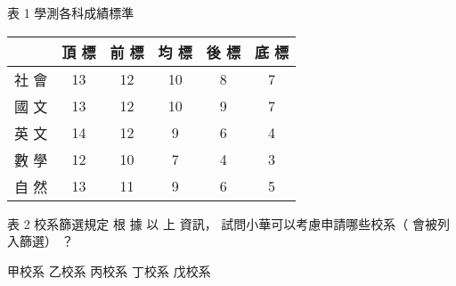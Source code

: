 \begin{QUESTIONS}
\begin{QUESTION}
\begin{QBODY}
            表 1 學測各科成績標準
            \begin{tabular}{|c|c|c|c|c|c|}
            	\hline
            	     & 頂 標 & 前 標 & 均 標 & 後 標 & 底 標 \\ \hline
            	社 會 & 13  & 12  & 10  &  8  &  7  \\ \hline
            	國 文 & 13  & 12  & 10  &  9  &  7  \\ \hline
            	英 文 & 14  & 12  &  9  &  6  &  4  \\ \hline
            	數 學 & 12  & 10  &  7  &  4  &  3  \\ \hline
            	自 然 & 13  & 11  &  9  &  6  &  5  \\ \hline
            \end{tabular} 
    
            表 2 校系篩選規定
            根 據 以 上 資訊， 試問小華可以考慮申請哪些校系（ 會被列入篩選） ？
            \begin{QOPS}
                \QOP 甲校系 
                \QOP 乙校系 
                \QOP 丙校系 
                \QOP 丁校系
                \QOP 戊校系
            \end{QOPS}
            

\end{QBODY}
\end{QUESTION}
\end{QUESTIONS}
